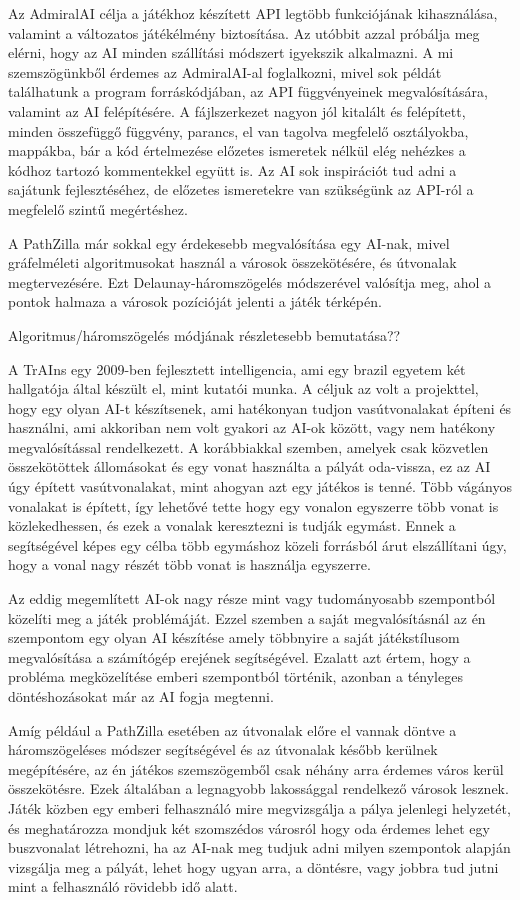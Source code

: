Az AdmiralAI célja a játékhoz készített API legtöbb funkciójának kihasználása, valamint a változatos játékélmény biztosítása. Az utóbbit azzal próbálja meg elérni, hogy az AI minden szállítási módszert igyekszik alkalmazni. A mi szemszögünkből érdemes az AdmiralAI-al foglalkozni, mivel sok példát találhatunk a program forráskódjában, az API függvényeinek megvalósítására, valamint az AI felépítésére. A fájlszerkezet nagyon jól kitalált és felépített, minden összefüggő függvény, parancs, el van tagolva megfelelő osztályokba, mappákba, bár a kód értelmezése előzetes ismeretek nélkül elég nehézkes a kódhoz tartozó kommentekkel együtt is. Az AI sok inspirációt tud adni a sajátunk fejlesztéséhez, de előzetes ismeretekre van szükségünk az API-ról a megfelelő szintű megértéshez.

A PathZilla már sokkal egy érdekesebb megvalósítása egy AI-nak, mivel gráfelméleti algoritmusokat használ a városok összekötésére, és útvonalak megtervezésére. Ezt Delaunay-háromszögelés módszerével valósítja meg, ahol a pontok halmaza a városok pozícióját jelenti a játék térképén.

Algoritmus/háromszögelés módjának részletesebb bemutatása??

A TrAIns egy 2009-ben fejlesztett intelligencia, ami egy brazil egyetem két hallgatója által készült el, mint kutatói munka. A céljuk az volt a projekttel, hogy egy olyan AI-t készítsenek, ami hatékonyan tudjon vasútvonalakat építeni és használni, ami akkoriban nem volt gyakori az AI-ok között, vagy nem hatékony megvalósítással rendelkezett. A korábbiakkal szemben, amelyek csak közvetlen összekötöttek állomásokat és egy vonat használta a pályát oda-vissza, ez az AI úgy épített vasútvonalakat, mint ahogyan azt egy játékos is tenné. Több vágányos vonalakat is épített, így lehetővé tette hogy egy vonalon egyszerre több vonat is közlekedhessen, és ezek a vonalak keresztezni is tudják egymást. Ennek a segítségével képes egy célba több egymáshoz közeli forrásból árut elszállítani úgy, hogy a vonal nagy részét több vonat is használja egyszerre.


Az eddig megemlített AI-ok nagy része mint vagy tudományosabb szempontból közelíti meg a játék problémáját. Ezzel szemben a saját megvalósításnál az én szempontom egy olyan AI készítése amely többnyire a saját játékstílusom megvalósítása a számítógép erejének segítségével. Ezalatt azt értem, hogy a probléma megközelítése emberi szempontból történik, azonban a tényleges döntéshozásokat már az AI fogja megtenni.

Amíg például a PathZilla esetében az útvonalak előre el vannak döntve a háromszögeléses módszer segítségével és az útvonalak később kerülnek megépítésére, az én játékos szemszögemből csak néhány arra érdemes város kerül összekötésre. Ezek általában a legnagyobb lakossággal rendelkező városok lesznek. Játék közben egy emberi felhasználó mire megvizsgálja a pálya jelenlegi helyzetét, és meghatározza mondjuk két szomszédos városról hogy oda érdemes lehet egy buszvonalat létrehozni, ha az AI-nak meg tudjuk adni milyen szempontok alapján vizsgálja meg a pályát, lehet hogy ugyan arra, a döntésre, vagy jobbra tud jutni mint a felhasználó rövidebb idő alatt.